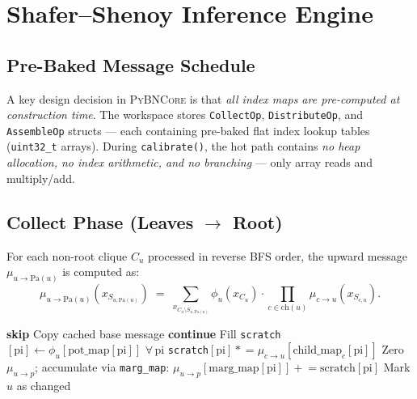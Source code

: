 \documentclass[11pt, letterpaper]{article}
\newcommand{\bncore}{\textsc{PyBNCore}}
\newcommand{\Pa}{\mathrm{Pa}}
\newcommand{\child}{\mathrm{ch}}
\theoremstyle{definitionstyle}
\begin{document}
\section{Shafer--Shenoy Inference Engine}
\label{sec:inference}

\subsection{Pre-Baked Message Schedule}

A key design decision in \bncore{} is that \emph{all index maps are
pre-computed at construction time}. The workspace stores \texttt{CollectOp},
\texttt{DistributeOp}, and \texttt{AssembleOp} structs — each containing
pre-baked flat index lookup tables (\texttt{uint32\_t} arrays). During
\texttt{calibrate()}, the hot path contains \emph{no heap allocation,
no index arithmetic, and no branching} — only array reads and multiply/add.

\subsection{Collect Phase (Leaves $\to$ Root)}

For each non-root clique $C_u$ processed in reverse BFS order, the
upward message $\mu_{u\to\Pa(u)}$ is computed as:
\[
  \mu_{u\to\Pa(u)}(x_{S_{u,\Pa(u)}}) \;=\;
  \sum_{x_{C_u\setminus S_{u,\Pa(u)}}}
  \phi_u(x_{C_u})\cdot \prod_{c\in\child(u)} \mu_{c\to u}(x_{S_{c,u}}).
\]

\begin{algorithm}[ht]
\caption{Collect (Sum-Product, Batch Path)}
\label{alg:collect}
\begin{algorithmic}[1]
   \textbf{skip} \EndIf
    \State Copy cached base message 
    \State \textbf{continue}
  \EndIf
  \State Fill \texttt{scratch}$[\text{pi}] \leftarrow
         \phi_u[\text{pot\_map}[\text{pi}]]$ \quad $\forall\,\text{pi}$
    \State \texttt{scratch}$[\text{pi}] \mathrel{*}=
           \mu_{c\to u}[\text{child\_map}_c[\text{pi}]]$ 
  \EndFor
  \State Zero $\mu_{u\to p}$; accumulate via \texttt{marg\_map}:
         $\mu_{u\to p}[\text{marg\_map}[\text{pi}]] \mathrel{+}= \text{scratch}[\text{pi}]$
  \State Mark $u$ as changed
\EndFor
\end{algorithmic}
\end{algorithm}
\end{document}
